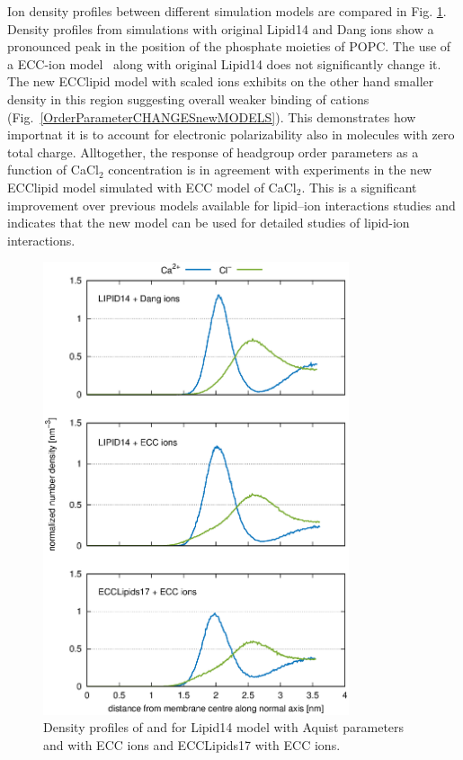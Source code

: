 \documentclass[aip,jcp,twocolumn]{revtex4}
\begin{document}
Ion density profiles between different simulation models are compared in Fig. \ref{fig:cacl-dens}.
Density profiles from simulations with original Lipid14 and Dang ions \cite{smith94,chang1999,dang2006} show a pronounced peak in the position of the phosphate moieties of POPC. 
The use of a ECC-ion model~\cite{kohagen14,kohagen16} along with original Lipid14 does not significantly change it. 
The new ECClipid model with scaled ions exhibits on the other hand smaller density in this region suggesting overall weaker binding of cations (Fig.~\ref{OrderParameterCHANGESnewMODELS}). 
This demonstrates how importnat it is to account for electronic polarizability also in molecules with zero total charge. 
Alltogether,
the response of headgroup order parameters as a function of CaCl$_2$ concentration is in agreement with
experiments in the new ECClipid model simulated with ECC model of CaCl$_2$. This is a significant improvement
over previous models available for lipid--ion interactions studies \cite{catte16} and indicates that
the new model can be used for detailed studies of lipid-ion interactions.

\begin{figure}[]
  \centering
  \includegraphics[width=9.0cm,angle=0]{../Fig/CAdensities.eps}
  \caption{\label{fig:cacl-dens}
    Density profiles of  and  for Lipid14 model with Aquist parameters and with ECC ions and ECCLipids17 with ECC ions. }
\end{figure}
\end{document}
